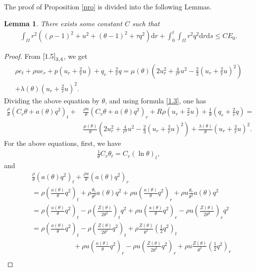 \documentclass[11pt,reqno]{amsart}
\numberwithin{equation}{section}
\newtheorem{lemma}[theorem]{Lemma}
\newcommand{\dif}{\mathrm{d}}
\begin{document}
The proof of Proposition \ref{pro} is divided into the following Lemmas.
\begin{lemma}\label{le1}
There exists some constant $C$ such that
\begin{align} \label{1.7}
\int_{\Omega}r^2\left((\rho-1)^2+u^2+ (\theta-1)^2+\tau   q^2\right)\dif r+\int_{0}^{t}\int_{\Omega} r^2 q^2 \dif r \dif s
\le CE_0.
\end{align}
\end{lemma}
\begin{proof}
From $\eqref{1.5}_{3, 4}$, we get
\begin{align}\label{1.8}
\rho e_t+\rho u e_r+p(u_r+\frac{2}{r} u)+q_r+\frac{2}{r} q=\mu(\theta)\left( 2u_r^2+\frac{4}{r^2}u^2-\frac{2}{3} \left(u_r+\frac{2}{r} u\right)^2\right) \nonumber
\\+\lambda(\theta)\left(u_r+\frac{2}{r} u\right)^2. \qquad\qquad
\end{align}
Dividing the above equation by $\theta$, and using formula \eqref{1.3}, one has
\begin{align*}
\frac{\rho}{\theta}(C_v\theta+a(\theta)q^2)_t+&\frac{\rho u}{\theta} (C_v \theta+a(\theta) q^2)_r+R \rho (u_r+\frac{2}{r} u)+\frac{1}{\theta}(q_r+\frac{2}{r}q)=\\
& \frac{\mu(\theta)}{\theta} \left( 2u_r^2+\frac{4}{r^2}u^2-\frac{2}{3} \left(u_r+\frac{2}{r} u\right)^2\right)+\frac{\lambda (\theta)}{\theta} \left(u_r+\frac{2}{r} u\right)^2.
\end{align*}
For the above equations, first, we have
\begin{align*}
\frac{1}{\theta}C_v\theta_t=C_v(\ln\theta)_t,
\end{align*}
and
\begin{align*}
&\frac{\rho}{\theta} (a(\theta)q^2)_t+\frac{\rho u}{\theta} (a(\theta) q^2)_r\\
&=\rho\left( \frac{a(\theta) }{\theta} q^2\right)_t+\rho \frac{\theta_t}{\theta^2} a(\theta) q^2 +\rho u \left( \frac{a(\theta)}{\theta} q^2 \right)_r+\rho u \frac{\theta_r}{\theta^2} a(\theta) q^2\\
&=\rho\left( \frac{a(\theta)}{\theta} q^2\right)_t-\rho \left( \frac{Z(\theta)}{2\theta^2}\right)_t q^2+\rho u \left( \frac{a(\theta)}{\theta} q^2 \right)_r-\rho u \left(\frac{Z(\theta)}{2\theta^2}\right)_r q^2\\
&=\rho \left( \frac{a(\theta)}{\theta} q^2 \right)_t-\rho \left(\frac{Z(\theta)}{2\theta^2}q^2\right)_t+\rho \frac{Z(\theta)}{\theta^2} \left(\frac{1}{2}q^2\right)_t\\
&\qquad\qquad\qquad+\rho u \left( \frac{a(\theta)}{\theta}q^2\right)_r-\rho u \left(\frac{Z(\theta)}{2\theta^2}q^2 \right)_r+\rho u \frac{Z(\theta)}{\theta^2} \left(\frac{1}{2} q^2\right)_r\\

\end{align*}
\end{proof}
\end{document}
